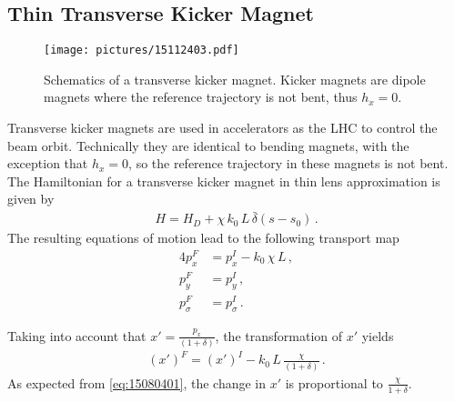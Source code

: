 




\subsection{Thin Transverse Kicker Magnet}

  \begin{figure}[t]
  \centering
  \texttt{[image: pictures/15112403.pdf]}
  \caption{Schematics of a transverse kicker magnet. Kicker magnets are dipole magnets where the reference trajectory is not bent, thus $h_x=0$. }  
  \label{pic:15112403}
  \end{figure}


Transverse kicker magnets are used in accelerators as the LHC to control the beam orbit. Technically they are identical to bending magnets, with the exception that $h_x=0$, so the reference trajectory in these magnets is not bent. The Hamiltonian for a transverse kicker magnet in thin lens approximation is given by
%
\begin{align}
  H=  H_D + \chi \, k_0 \, L \, \bar{\delta}(s-s_0) \, .
\end{align}
%
The resulting equations of motion lead to the following transport map
\begin{alignat}{4}
p_x^F & = p_x^I - k_0 \, \chi \, L\, \label{eq:kickermagnet} ,\\ 
p_y^F & = p_y^I\, ,\\ 
p_\sigma^F & = p_\sigma^I \, .
\end{alignat}

Taking into account that $x' = \frac{p_x}{(1+\delta)}$, the transformation of $x'$ yields
%
\begin{align}
  (x')^F = (x')^I - k_0 \, L \, \frac{\chi}{(1+\delta)} \, .
\end{align}
As expected from \eqref{eq:15080401}, the change in $x'$ is proportional to $\frac{\chi}{1+\delta}$.

